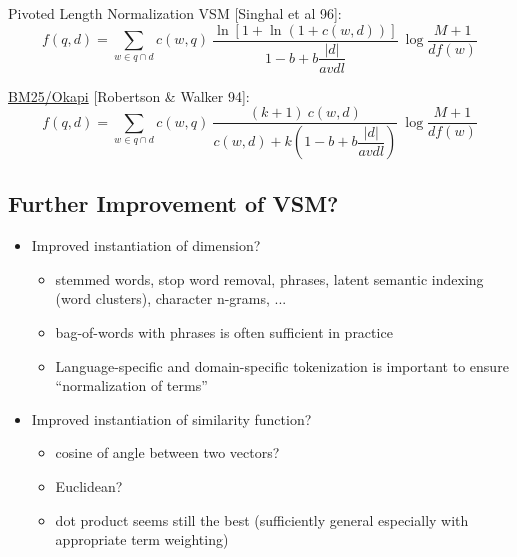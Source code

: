 Pivoted Length Normalization VSM [Singhal et al 96]:
\begin{equation*}
f(q, d) = \sum_{w \in q \cap d} c(w, q) \: \frac{\ln[1+\ln(1+c(w, d))]}{1-b+b\dfrac{|d|}{avdl}} \: \log\frac{M+1}{df(w)}
\end{equation*}


\href{https://ru.wikipedia.org/wiki/Okapi_BM25}{BM25/Okapi} [Robertson \& Walker 94]:
\begin{equation*}
f(q, d) = \sum_{w \in q \cap d} c(w, q) \: \frac{(k+1) \: c(w, d)}{c(w, d) + k\left(1-b+b\dfrac{|d|}{avdl}\right)} \: \log\frac{M+1}{df(w)}
\end{equation*}

\subsection{Further Improvement of VSM?}
\begin{itemize}
\item Improved instantiation of dimension?
\begin{itemize}
\item  stemmed words, stop word removal, phrases, latent semantic indexing (word clusters), character n-grams, ...
\item  bag-of-words with phrases is often sufficient in practice
\item  Language-specific and domain-specific tokenization is important to
ensure “normalization of terms”
\end{itemize}

\item  Improved instantiation of similarity function?
\begin{itemize}
\item  cosine of angle between two vectors?
\item  Euclidean?
\item  dot product seems still the best (sufficiently general especially with appropriate term weighting)
\end{itemize}
\end{itemize}


